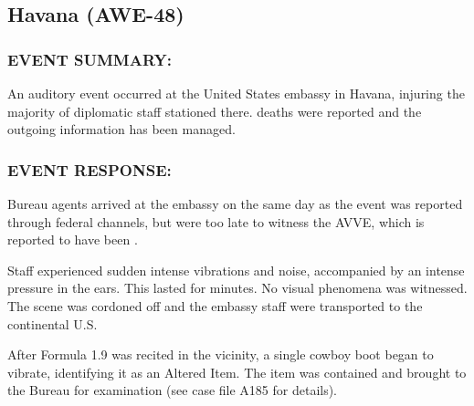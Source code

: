 \subsection*{Havana (AWE-48)}
\subsubsection*{EVENT SUMMARY:}
\par An auditory event occurred at the United States embassy in
Havana, injuring the majority of diplomatic staff stationed there.
 deaths were reported and the outgoing information has
been managed.
\subsubsection*{EVENT RESPONSE:}
\par Bureau agents arrived at the embassy on the same day as the
event was reported through federal channels, but were too late to
witness the AVVE, which is reported to have been .
\par Staff experienced sudden intense vibrations and noise,
accompanied by an intense pressure in the ears. This lasted for 
minutes. No visual phenomena was witnessed. The scene
was cordoned off and the embassy staff were transported to the
continental U.S.
\par After Formula 1.9 was recited in the vicinity, a single cowboy boot
began to vibrate, identifying it as an Altered Item. The item was
contained and brought to the Bureau for examination (see case
file A185 for details).